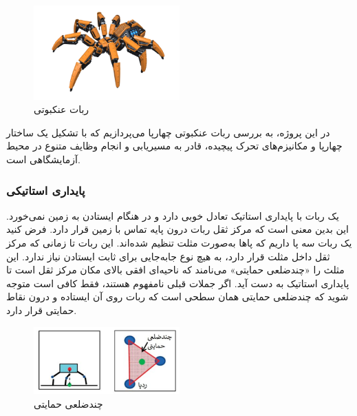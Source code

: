 \begin{figure}[h]
	\centering
	\includegraphics[width=0.5\textwidth]{./images/Chapter1/Spider2}	
	\caption[ربات عنکبوتی]{ربات عنکبوتی \cite{SpiderRobot}}
	\label{ربات عنکبوتی}
\end{figure}
\noindent
\unskip
در این پروژه، به بررسی ربات‌ عنکبوتی چهارپا می‌پردازیم که با تشکیل یک ساختار چهارپا و مکانیزم‌های تحرک پیچیده، قادر به مسیریابی و انجام وظایف متنوع در محیط‌ آزمایشگاهی است.

\subsubsection{پایداری استاتیکی}

یک ربات با پایداری استاتیک تعادل خوبی دارد و در هنگام ایستادن به زمین نمی‌خورد. این بدین معنی است که مرکز ثقل ربات درون پایه تماس با زمین قرار دارد. فرض کنید یک ربات سه پا داریم که پاها به‌صورت مثلت تنظیم شده‌اند. این ربات تا زمانی که مرکز ثقل داخل مثلت قرار دارد، به هیچ نوع جابه‌جایی برای ثابت ایستادن نیاز ندارد. این مثلث را «چند‌ضلعی حمایتی» می‌نامند که ناحیه‌ای افقی بالای مکان مرکز ثقل است تا پایداری استاتیک به دست آید. اگر جملات قبلی نامفهوم هستند، فقط کافی است متوجه شوید که چندضلعی حمایتی همان سطحی است که ربات روی آن ایستاده و درون نقاط حمایتی قرار دارد.

\begin{figure}[h]
	\centering
	\includegraphics[width=0.5\textwidth]{./images/Chapter1/StaticStability}	
	\caption[پایداری استاتیکی]{چندضلعی حمایتی \cite{StaticStability}}
	\label{پایداری استاتیکی}
\end{figure}
\noindent
\unskip



